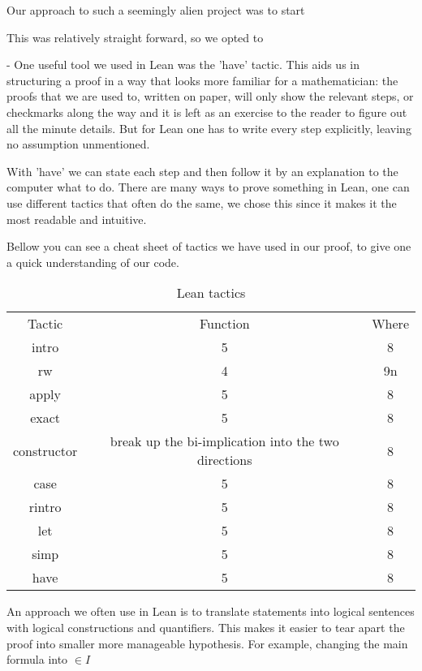 \documentclass[../main.tex]{subfiles}
\begin{document}
Our approach to such a seemingly alien project was to start 


This was relatively straight forward, so we opted to 



- One useful tool we used in Lean was the 'have' tactic. This aids us in structuring a proof in a way that looks more familiar for a mathematician: the proofs that we are used to, written on paper, will only show the relevant steps, or checkmarks along the way and it is left as an exercise to the reader to figure out all the minute details. But for Lean one has to write every step explicitly, leaving no assumption unmentioned.

With 'have' we can state each step and then follow it by an explanation to the computer what to do. 
There are many ways to prove something in Lean, one can use different tactics that often do the same, we chose this since it makes it the most readable and intuitive.



Bellow you can see a cheat sheet of tactics we have used in our proof, to give one a quick understanding of our code.

\begin{table}[H]
    \centering
    \begin{tabular}{c|c|c}
     Tactic  & Function & Where \\
     intro  & 5 & 8 \\
     rw  & 4 & 9n  \\
     apply  & 5 & 8 \\
     exact  & 5 & 8 \\
     constructor  &  break up the bi-implication into the two directions & 8 \\
     case  & 5 & 8 \\
     rintro  & 5 & 8 \\
     let  & 5 & 8 \\
     simp  & 5 & 8 \\
     have  & 5 & 8 \\
    \end{tabular}
    \caption{Lean tactics}
    \label{tab:my_label}
\end{table}

An approach we often use in Lean is to translate statements into logical sentences with logical constructions and quantifiers. This makes it easier to tear apart the proof into smaller more manageable hypothesis. For example, changing the main formula into $\in I$
\end{document}
